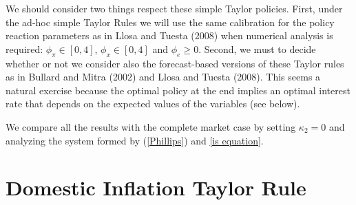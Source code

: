 \documentclass{article}
\begin{document}
We should consider two things respect these simple Taylor policies. First,
under the ad-hoc simple Taylor Rules we will use the same calibration for
the policy reaction parameters as in Llosa and Tuesta (2008) when numerical
analysis is required: $\phi _{\pi }\in \left[ 0,4\right] $, $\phi _{x}\in %
\left[ 0,4\right] $ and $\phi _{e}\geq 0.$ Second, we must to decide whether
or not we consider also the forecast-based versions of these Taylor rules as
in Bullard and Mitra (2002) and Llosa and Tuesta (2008). This seems a
natural exercise because the optimal policy at the end implies an optimal
interest rate that depends on the expected values of the variables (see
below).

We compare all the results with the complete market case by setting $\kappa
_{2}=0$ and analyzing the system formed by (\ref{Phillips}) and \ref{is
equation}.

\section{Domestic Inflation Taylor Rule}
\end{document}
